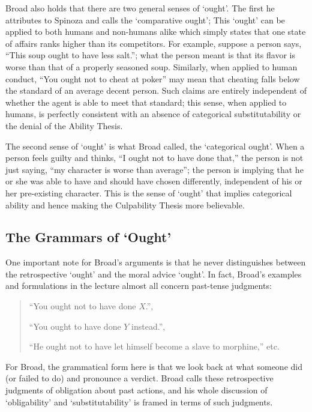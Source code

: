 \noindent Broad also holds that there are two general senses of `ought'. The first
he attributes to Spinoza and calls the `comparative ought'; This `ought'
can be applied to both humans and non-humans alike which simply states
that one state of affairs ranks higher than its competitors. For
example, suppose a person says, ``This soup ought to have less salt.'';
what the person meant is that its flavor is worse than that of a
properly seasoned soup. Similarly, when applied to human conduct, ``You
ought not to cheat at poker'' may mean that cheating falls below the
standard of an average decent person. Such claims are entirely
independent of whether the agent is able to meet that standard; this
sense, when applied to humans, is perfectly consistent with an absence
of categorical substitutability or the denial of the Ability Thesis.

The second sense of `ought' is what Broad called, the `categorical
ought'. When a person feels guilty and thinks, ``I ought not to have
done that,'' the person is not just saying, ``my character is worse than
average''; the person is implying that he or she was able to have and
should have chosen differently, independent of his or her pre-existing
character. This is the sense of `ought' that implies categorical ability
and hence making the Culpability Thesis more believable.

\subsection{The Grammars of `Ought'}

One important note for Broad's arguments is that he never distinguishes
between the retrospective `ought' and the moral advice `ought'. In fact,
Broad's examples and formulations in the lecture almost all concern
past-tense judgments:

\vspace{-1em}
\begin{quote}
``You ought not to have done $X$.'',

``You ought to have done $Y$ instead.'',

``He ought not to have let himself become a slave to morphine,'' etc.
\end{quote}

\noindent For Broad, the grammatical form here is that we look back at what
someone did (or failed to do) and pronounce a verdict. Broad calls these
retrospective judgments of obligation about past actions, and his whole
discussion of `obligability' and `substitutability' is framed in terms
of such judgments.

